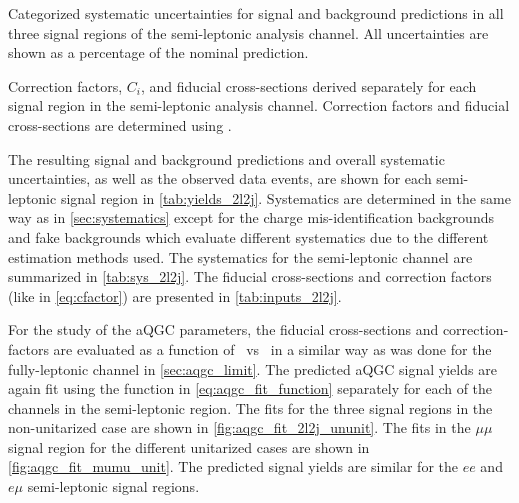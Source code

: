 \begin{table}[ht!]
\centering

\caption{Categorized systematic uncertainties 
for signal and background predictions in all three signal regions
of the semi-leptonic analysis channel.
All uncertainties are shown as a percentage of the nominal
prediction.  }
\label{tab:sys_2l2j}
\end{table}

\begin{table}[ht!]
\centering

\caption{Correction factors, $C_i$, and fiducial cross-sections derived
separately for each signal region in the semi-leptonic analysis channel. 
Correction factors and  fiducial cross-sections are determined
using \madgraph.}
\label{tab:inputs_2l2j}
\end{table}

The resulting signal and background predictions and overall systematic uncertainties,
as well as the observed data events,
are shown for each semi-leptonic signal region in \tab\ref{tab:yields_2l2j}. Systematics
are determined in the same way as in \sec\ref{sec:systematics} except for the charge
mis-identification backgrounds and fake backgrounds which evaluate different systematics due
to the different estimation methods used. The systematics for the semi-leptonic
channel are summarized in \tab\ref{tab:sys_2l2j}. The fiducial cross-sections
and correction factors (like in \eqn\eqref{eq:cfactor}) are presented in \tab\ref{tab:inputs_2l2j}.

For the study of the aQGC parameters, the fiducial cross-sections
and correction-factors are evaluated as a function of 
\fszero~vs \fsone~in a similar way as was done for the fully-leptonic
channel in \sec\ref{sec:aqgc_limit}.
The predicted aQGC signal yields are again fit using the function in 
\eqn\eqref{eq:aqgc_fit_function} separately for each of the channels in the semi-leptonic region.
The fits for the three signal regions in the non-unitarized case are shown in 
\fig\ref{fig:aqgc_fit_2l2j_ununit}. The fits in the $\mu\mu$ signal region for the different
unitarized cases are shown in \fig\ref{fig:aqgc_fit_mumu_unit}. The predicted signal yields
are similar for the $ee$ and $e\mu$ semi-leptonic signal regions. 


